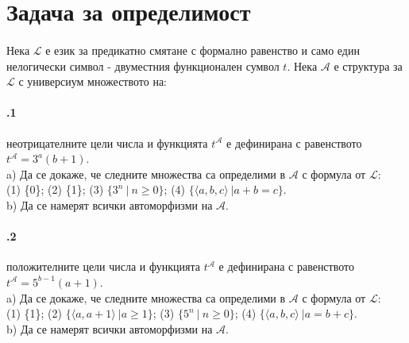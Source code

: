 \documentclass{article}
\begin{document}
\newpage
\section{Задача за определимост}
\paragraph{}
Нека $\mathcal{L}$ е език за предикатно смятане с формално равенство и само един нелогически символ - двуместния функционален сумвол $t$. Нека $\mathcal{A}$ е структура за $\mathcal{L}$ с универсиум множеството на: 
\paragraph{\hspace{0.5em} .1} 
\begin{addmargin}[1em]{2em}
неотрицателните цели числа и функцията $t^\mathcal{A}$ е дефинирана с равенството $t^\mathcal{A} = 3^a(b+1)$. \\ \indent
a) Да се докаже, че следните множества са определими в $\mathcal{A}$ с формула от $\mathcal{L}$: \\ \indent \indent
(1) \{0\}; (2) \{1\}; (3) $\{3^n\ |\ n \geq 0\}$; (4) $\{ \langle a, b, c \rangle \ | a + b = c\}$.  \\ \indent
b) Да се намерят всички автоморфизми на $\mathcal{A}$.
\end{addmargin}

\vskip 0.2in

\paragraph{\hspace{0.5em} .2} 
\begin{addmargin}[1em]{2em}
положителните цели числа и функцията $t^\mathcal{A}$ е дефинирана с равенството $t^\mathcal{A} = 5^{b-1}(a+1)$. \\ \indent
a) Да се докаже, че следните множества са определими в $\mathcal{A}$ с формула от $\mathcal{L}$: \\ \indent \indent
(1) \{1\}; (2) $\{ \langle a , a + 1 \rangle\ | a \geq 1\}$; (3) $\{5^n\ |\ n \geq 0\}$; (4) $\{ \langle a, b, c \rangle \ | a = b + c\}$. \\ \indent
b) Да се намерят всички автоморфизми на $\mathcal{A}$.
\end{addmargin}
\end{document}
